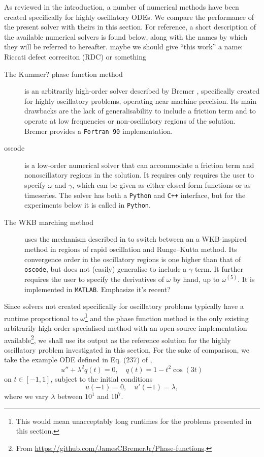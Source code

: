 \documentclass[10pt]{article}
\newcommand{\be}{\begin{equation}}
\newcommand{\ee}{\end{equation}}
\newcommand{\om}{\omega}
\newcommand{\g}{\gamma}
\newcommand{\AB}[1]{{\color{orange}#1}}
\begin{document}
As reviewed in the introduction, a number of numerical methods have been
created specifically for highly oscillatory ODEs. We compare the performance of
the present solver with theirs in this section. For reference, a short
description of the available numerical solvers is found below, along with the
names by which they will be referred to hereafter. 
\AB{maybe we should give ``this work'' a name: Riccati defect correciton (RDC) or something}
%
\begin{description}
\item[The \AB{Kummer?}
  phase function method]{is an arbitrarily high-order solver
        described by Bremer \cite{bremer2018}, specifically created for highly
        oscillatory problems, operating near machine precision. Its main
        drawbacks are the lack of generalisability to include a friction term
        and to operate at low frequencies or non-oscillatory regions of the
        solution. Bremer provides a \texttt{Fortran 90} implementation.
        }
\item[oscode]   %
{is a low-order numerical solver
        \cite{agocs2020efficient,agocs2020dense} that can accommodate a
        friction term and nonoscillatory regions in the solution. It requires
        only requires the user to specify $\om$ and $\g$, which can be given as
        either closed-form functions or as timeseries. The solver has both a
        \texttt{Python} and \texttt{C++} interface, but for the experiments below it is called in
        \texttt{Python}.}
    \item[The WKB marching method]{\cite{arnold2011wkb,korner2022wkb} uses the
        mechanism described in \cite{agocs2020efficient} to switch between an a
        WKB-inspired method in regions of rapid oscillation and Runge--Kutta
        method. Its convergence order in the oscillatory regions is one higher
        than that of \texttt{oscode}, but does not (easily) generalise to
        include a $\g$ term. It further requires the user to specify the
        derivatives of $\om$ by hand, up to $\om^{(5)}$. It is implemented in \texttt{MATLAB}.
        \AB{Emphasize it's recent?}
    }
\end{description}
%
Since solvers not created specifically for oscillatory problems typically have
a runtime proportional to $\om$\footnote{This would mean unacceptably long
runtimes for the problems presented in this section.} and the phase function
method is the only existing 
arbitrarily high-order specialised method with an open-source implementation
available\footnote{From
\url{https://github.com/JamesCBremerJr/Phase-functions}.}, we shall use its
output as the reference solution for the highly oscillatory problem
investigated in this section. For the sake of comparison, we take the example
ODE defined in Eq. (237) of \cite{bremer2018},
\be\label{bremer237eq}
u'' + \lambda^2 q(t) = 0, \quad q(t) = 1 - t^2\cos(3t)
\ee
on $t \in [-1, 1]$, subject to the initial conditions
\be\label{bremer237ic}
u(-1) = 0, \quad u'(-1) = \lambda,
\ee
where we vary $\lambda$ between $10^1$ and $10^7$.
\end{document}
